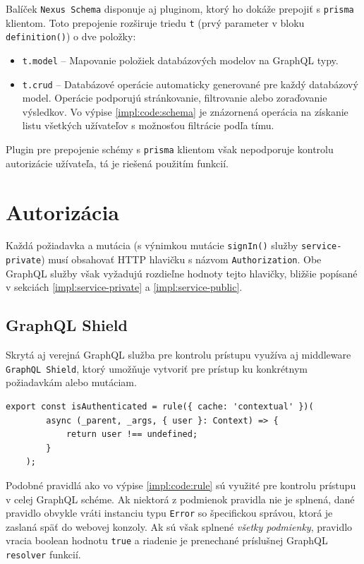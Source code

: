 \noindent Balíček \texttt{Nexus Schema} disponuje aj pluginom, ktorý ho dokáže prepojiť s \texttt{prisma} klientom. Toto prepojenie rozširuje triedu \texttt{t} (prvý parameter v bloku \texttt{definition()}) o dve položky:

\begin{itemize}
	\item \texttt{t.model} -- Mapovanie položiek databázových modelov na GraphQL typy.
	\item \texttt{t.crud} -- Databázové operácie automaticky generované pre každý databázový model. Operácie podporujú stránkovanie, filtrovanie alebo zoraďovanie výsledkov. Vo výpise \ref{impl:code:schema} je znázornená operácia na získanie listu všetkých užívateľov s možnosťou filtrácie podľa tímu.
\end{itemize}

\noindent Plugin pre prepojenie schémy s \texttt{prisma} klientom však nepodporuje kontrolu autorizácie užívateľa, tá je riešená použitím  funkcií.

\section{Autorizácia}
Každá požiadavka a mutácia (s výnimkou mutácie \texttt{signIn()} služby \texttt{service-private}) musí obsahovať HTTP hlavičku s názvom \texttt{Authorization}. Obe GraphQL služby však vyžadujú rozdieľne hodnoty tejto hlavičky, bližšie popísané v sekciách \ref{impl:service-private} a \ref{impl:service-public}.

\subsection{GraphQL Shield}
Skrytá aj verejná GraphQL služba pre kontrolu prístupu využíva aj middleware \texttt{GraphQL Shield}, ktorý umožňuje vytvoriť  pre prístup ku konkrétnym požiadavkám alebo mutáciam. \\

\begin{lstlisting}[caption={Pravidlo \texttt{GraphQL Shield} kontrolujúce či je užívateľ autentifikovaný.}, label={impl:code:rule}]
	export const isAuthenticated = rule({ cache: 'contextual' })(
		async (_parent, _args, { user }: Context) => {
			return user !== undefined;
		}
	);
\end{lstlisting}

\medskip

\noindent Podobné pravidlá ako vo výpise \ref{impl:code:rule} sú využité pre kontrolu prístupu v celej GraphQL schéme. Ak niektorá z podmienok pravidla nie je splnená, dané pravidlo obvykle vráti instanciu typu \texttt{Error} so špecifickou správou, ktorá je zaslaná späť do webovej konzoly. Ak sú však splnené \emph{všetky podmienky}, pravidlo vracia boolean hodnotu \texttt{true} a riadenie je prenechané príslušnej GraphQL \texttt{resolver} funkcií.


